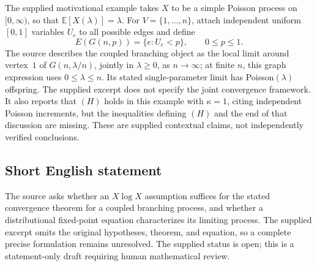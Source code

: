 \documentclass[11pt]{article}
\newcommand{\E}{\mathbb{E}}
\begin{document}
The supplied motivational example takes \(X\) to be a simple Poisson process on \([0,\infty)\), so that \(\E[X(\lambda)]=\lambda\). For \(V=\{1,\ldots,n\}\), attach independent uniform \([0,1]\) variables \(U_e\) to all possible edges and define
\[
E(G(n,p))=\{e:U_e<p\},\qquad 0\leq p\leq1.
\]
The source describes the coupled branching object as the local limit around vertex~\(1\) of \(G(n,\lambda/n)\), jointly in \(\lambda\geq0\), as \(n\to\infty\); at finite \(n\), this graph expression uses \(0\leq\lambda\leq n\). Its stated single-parameter limit has Poisson\((\lambda)\) offspring. The supplied excerpt does not specify the joint convergence framework. It also reports that \((H)\) holds in this example with \(\kappa=1\), citing independent Poisson increments, but the inequalities defining \((H)\) and the end of that discussion are missing. These are supplied contextual claims, not independently verified conclusions.
\subsection{Short English statement}
The source asks whether an \(X\log X\) assumption suffices for the stated convergence theorem for a coupled branching process, and whether a distributional fixed-point equation characterizes its limiting process. The supplied excerpt omits the original hypotheses, theorem, and equation, so a complete precise formulation remains unresolved. The supplied status is open; this is a statement-only draft requiring human mathematical review.
\end{document}
